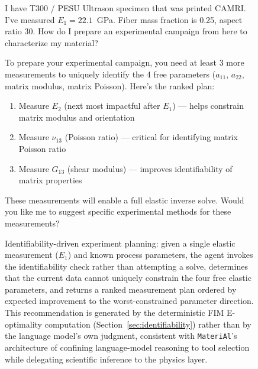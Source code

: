 \documentclass[preprint,review,10pt,number]{elsarticle}
\begin{document}
\begin{figure}[h]
\begin{tcolorbox}[
    colback=gray!5,
    colframe=black,
    boxrule=0.6pt,
    arc=2pt,
    left=8pt, right=8pt, top=6pt, bottom=6pt,
    title={\textbf{Identifiability Demo} \hfill \textit{Experimental campaign planning}},
    fonttitle=\small
]
\begin{tcolorbox}[
    colback=gray!8,
    colframe=gray!60,
    boxrule=0.5pt,
    arc=2pt,
    left=6pt, right=6pt, top=4pt, bottom=4pt,
    title={\textbf{User}},
    fonttitle=\small\bfseries,
    coltitle=black
]
\small
I have T300 / PESU Ultrason specimen that was printed CAMRI. I've 
measured $E_1 = 22.1$~GPa. Fiber mass fraction is 0.25, aspect ratio 
30. How do I prepare an experimental campaign from here to 
characterize my material?
\end{tcolorbox}
\vspace{6pt}
\begin{tcolorbox}[
    colback=gray!3,
    colframe=gray!40,
    boxrule=0.5pt,
    arc=2pt,
    left=6pt, right=6pt, top=4pt, bottom=4pt,
    title={\textbf{\texttt{MateriAl}} \hfill \texttt{\footnotesize \textcolor{gray!70!black}{\ding{110}\ check\_identifiability}}},
    fonttitle=\small\bfseries,
    coltitle=black
]
\small
To prepare your experimental campaign, you need at least 3 more 
measurements to uniquely identify the 4 free parameters ($a_{11}$, 
$a_{22}$, matrix modulus, matrix Poisson). Here's the ranked plan:
\vspace{4pt}
\begin{enumerate}[leftmargin=1.4em, itemsep=1pt, topsep=2pt]
\item Measure $E_2$ (next most impactful after $E_1$) --- helps 
constrain matrix modulus and orientation
\item Measure $\nu_{13}$ (Poisson ratio) --- critical for 
identifying matrix Poisson ratio
\item Measure $G_{13}$ (shear modulus) --- improves identifiability 
of matrix properties
\end{enumerate}
\vspace{4pt}
These measurements will enable a full elastic inverse solve. Would 
you like me to suggest specific experimental methods for these 
measurements?
\end{tcolorbox}
\end{tcolorbox}
\caption{Identifiability-driven experiment planning: given a single 
elastic measurement ($E_1$) and known process parameters, the agent 
invokes the identifiability check rather than attempting a solve, 
determines that the current data cannot uniquely constrain the four 
free elastic parameters, and returns a ranked measurement plan 
ordered by expected improvement to the worst-constrained parameter 
direction. This recommendation is generated by the deterministic FIM 
E-optimality computation (Section~\ref{sec:identifiability}) rather 
than by the language model's own judgment, consistent with 
\texttt{MateriAl}'s architecture of confining language-model 
reasoning to tool selection while delegating scientific inference to 
the physics layer.}
\label{fig:identifiability_demo}
\end{figure}
\end{document}
